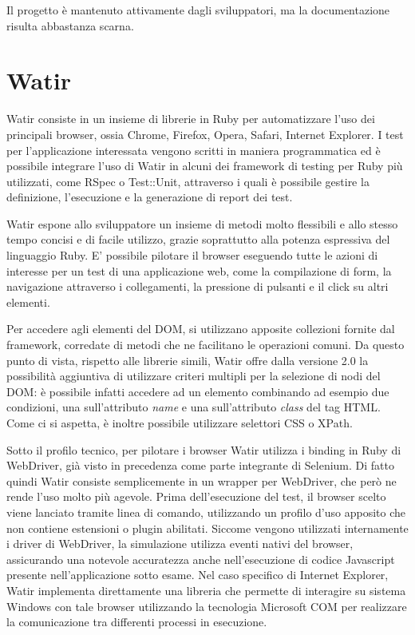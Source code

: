 Il progetto è mantenuto attivamente dagli sviluppatori, ma la documentazione risulta abbastanza scarna. %

\section{Watir}

Watir consiste in un insieme di librerie in Ruby per automatizzare l'uso dei principali browser, ossia Chrome, Firefox, Opera, Safari, Internet Explorer. I test per l'applicazione interessata vengono scritti in maniera programmatica ed è possibile integrare l'uso di Watir in alcuni dei framework di testing per Ruby più utilizzati, come RSpec o Test::Unit, attraverso i quali è possibile gestire la definizione, l'esecuzione e la generazione di report dei test.

Watir espone allo sviluppatore un insieme di metodi molto flessibili e allo stesso tempo concisi e di facile utilizzo, grazie soprattutto alla potenza espressiva del linguaggio Ruby. E' possibile pilotare il browser eseguendo tutte le azioni di interesse per un test di una applicazione web, come la compilazione di form, la navigazione attraverso i collegamenti, la pressione di pulsanti e il click su altri elementi. 

Per accedere agli elementi del DOM, si utilizzano apposite collezioni fornite dal framework, corredate di metodi che ne facilitano le operazioni comuni. Da questo punto di vista, rispetto alle librerie simili, Watir offre dalla versione 2.0 la possibilità aggiuntiva di utilizzare criteri multipli per la selezione di nodi del DOM: è possibile infatti accedere ad un elemento combinando ad esempio due condizioni, una sull'attributo \emph{name} e una sull'attributo \emph{class} del tag HTML. Come ci si aspetta, è inoltre possibile utilizzare selettori CSS o XPath.

Sotto il profilo tecnico, per pilotare i browser Watir utilizza i binding in Ruby di WebDriver, già visto in precedenza come parte integrante di Selenium. Di fatto quindi Watir consiste semplicemente in un wrapper per WebDriver, che però ne rende l'uso molto più agevole. Prima dell'esecuzione del test, il browser scelto viene lanciato tramite linea di comando, utilizzando un profilo d'uso apposito che non contiene estensioni o plugin abilitati. Siccome vengono utilizzati internamente i driver di WebDriver, la simulazione utilizza eventi nativi del browser, assicurando una notevole accuratezza anche nell'esecuzione di codice Javascript presente nell'applicazione sotto esame. Nel caso specifico di Internet Explorer, Watir implementa direttamente una libreria che permette di interagire su sistema Windows con tale browser utilizzando la tecnologia Microsoft COM per realizzare la comunicazione tra differenti processi in esecuzione.

